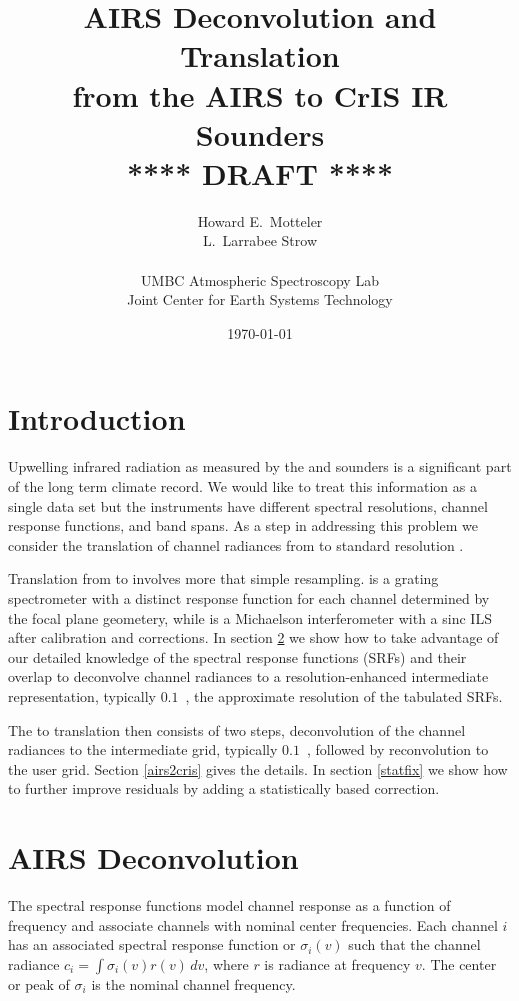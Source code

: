 \documentclass[12pt]{article}
\title{AIRS Deconvolution and Translation \\
  from the AIRS to CrIS IR Sounders \\
  \vspace{3mm}
  {****} DRAFT {****}\\
}
\author{Howard E.~Motteler \\
  L.~Larrabee Strow \\
  \\
  UMBC Atmospheric Spectroscopy Lab \\
  Joint Center for Earth Systems Technology \\
}
\date{\today}
\begin{document}
\maketitle

\section{Introduction}

Upwelling infrared radiation as measured by the {\airs} \cite{airs1}
and {\cris} \cite{cris1,cris2} sounders is a significant part of the
long term climate record.  We would like to treat this information as
a single data set but the instruments have different spectral
resolutions, channel response functions, and band spans.  As a step
in addressing this problem we consider the translation of channel
radiances from {\airs} to standard resolution {\cris}.

Translation from {\airs} to {\cris} involves more that simple
resampling.  {\airs} is a grating spectrometer with a distinct
response function for each channel determined by the focal plane
geometery, while {\cris} is a Michaelson interferometer with a sinc
ILS after calibration and corrections.  In section \ref{decon} we
show how to take advantage of our detailed knowledge of the {\airs}
spectral response functions (SRFs) and their overlap to deconvolve
channel radiances to a resolution-enhanced intermediate
representation, typically $0.1$~\wn, the approximate resolution of
the tabulated {\airs} SRFs.

The {\airs} to {\cris} translation then consists of two steps,
deconvolution of the {\airs} channel radiances to the intermediate
grid, typically $0.1$~\wn, followed by reconvolution to the {\cris}
user grid.  Section \ref{airs2cris} gives the details.  In section
\ref{statfix} we show how to further improve residuals by adding a
statistically based correction.

\FloatBarrier
\section{AIRS Deconvolution}
\label{decon}

The {\airs} spectral response functions model channel response as a
function of frequency and associate channels with nominal center
frequencies.  Each {\airs} channel $i$ has an associated spectral
response function or {\srf} $\sigma_i(v)$ such that the channel
radiance $c_i = \int \sigma_i(v)r(v)\,dv$, where $r$ is radiance at
frequency $v$.  The center or peak of $\sigma_i$ is the nominal
channel frequency.
\end{document}
